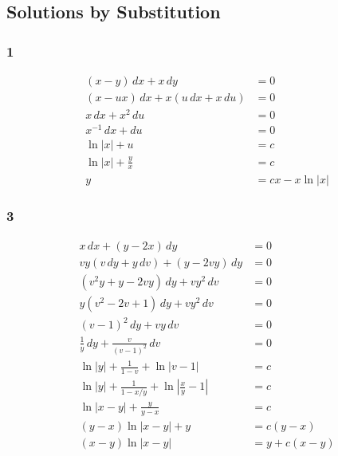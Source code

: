 \documentclass{article}
\begin{document}
\subsection{Solutions by Substitution}

\subsubsection{1}

\begin{align*}
  (x - y) \,d x + x \,d y                 & = 0               \\
  (x - u x) \,d x + x (u \,d x + x \,d u) & = 0               \\
  x \,d x + x^2 \,d u                     & = 0               \\
  x^{-1} \,d x + d u                      & = 0               \\
  \ln |x| + u                             & = c               \\
  \ln |x| + \frac{y}{x}                   & = c               \\
  y                                       & = c x - x \ln |x|
\end{align*}

\subsubsection{3}

\begin{align*}
  x \,dx + (y - 2 x) \,dy                                            & = 0             \\
  v y (v \,dy + y \,dv) + (y - 2 v y) \,dy                           & = 0             \\
  (v^2 y + y - 2 v y) \,dy + v y^2 \,dv                              & = 0             \\
  y (v^2 - 2 v + 1) \,dy + v y^2 \,dv                                & = 0             \\
  (v - 1)^2 \,dy + v y \,dv                                          & = 0             \\
  \frac{1}{y} \,dy + \frac{v}{(v - 1)^2} \,dv                        & = 0             \\
  \ln |y| + \frac{1}{1 - v} + \ln |v - 1|                            & = c             \\
  \ln |y| + \frac{1}{1 - x / y} + \ln \left| \frac{x}{y} - 1 \right| & = c             \\
  \ln |x - y| + \frac{y}{y - x}                                      & = c             \\
  (y - x) \ln |x - y| + y                                            & = c (y - x)     \\
  (x - y) \ln |x - y|                                                & = y + c (x - y)
\end{align*}
\end{document}

